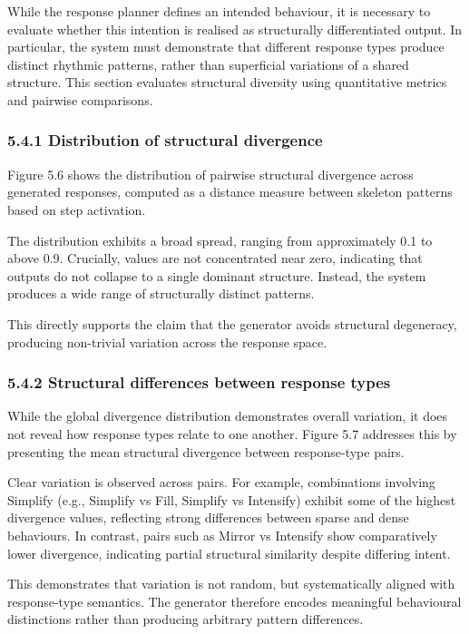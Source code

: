 While the response planner defines an intended behaviour, it is
necessary to evaluate whether this intention is realised as structurally
differentiated output. In particular, the system must demonstrate that
different response types produce distinct rhythmic patterns, rather than
superficial variations of a shared structure. This section evaluates
structural diversity using quantitative metrics and pairwise
comparisons.

\subsubsection{5.4.1 Distribution of structural
divergence}\label{distribution-of-structural-divergence}

Figure 5.6 shows the distribution of pairwise structural divergence
across generated responses, computed as a distance measure between
skeleton patterns based on step activation.

The distribution exhibits a broad spread, ranging from approximately 0.1
to above 0.9. Crucially, values are not concentrated near zero,
indicating that outputs do not collapse to a single dominant structure.
Instead, the system produces a wide range of structurally distinct
patterns.

This directly supports the claim that the generator avoids structural
degeneracy, producing non-trivial variation across the response space.

\subsubsection{5.4.2 Structural differences between response
types}\label{structural-differences-between-response-types}

While the global divergence distribution demonstrates overall variation,
it does not reveal how response types relate to one another. Figure 5.7
addresses this by presenting the mean structural divergence between
response-type pairs.

Clear variation is observed across pairs. For example, combinations
involving Simplify (e.g., Simplify vs Fill, Simplify vs Intensify)
exhibit some of the highest divergence values, reflecting strong
differences between sparse and dense behaviours. In contrast, pairs such
as Mirror vs Intensify show comparatively lower divergence, indicating
partial structural similarity despite differing intent.

This demonstrates that variation is not random, but systematically
aligned with response-type semantics. The generator therefore encodes
meaningful behavioural distinctions rather than producing arbitrary
pattern differences.

